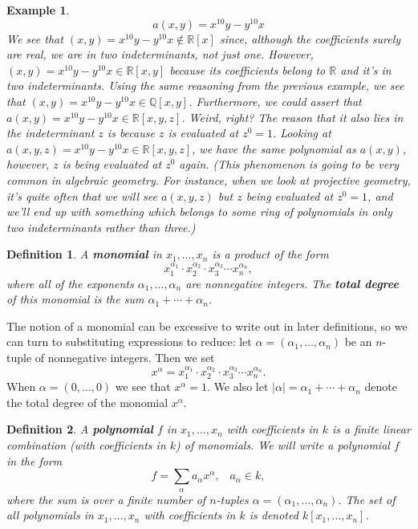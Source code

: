 \documentclass[12pt,reqno]{amsart}
\theoremstyle{plain}
\newtheorem{defi}{Definition}
\newtheorem{ex}{Example}
\newcommand{\rr}{\mathbb R}
\newcommand{\qq}{\mathbb Q}
\newcommand{\gap}{\; \; \;}
\begin{document}
\begin{ex} $$a(x, y) = x^{10} y - y^{10} x $$
We see that $(x, y) = x^{10} y - y^{10} x \notin \rr[x]$ since, although the coefficients surely are real, we are in two indeterminants, not just one. However, $(x, y) = x^{10} y - y^{10} x \in \rr[x, y]$ because its coefficients belong to $\rr$ and it's in two indeterminants. Using the same reasoning from the previous example, we see that $(x, y) = x^{10} y - y^{10} x \in \qq[x,y]$. Furthermore, we could assert that $a(x, y) = x^{10}y-y^{10} x \in \rr[x, y, z ]$. Weird, right? The reason that it also lies in the indeterminant $z$ is because $z$ is evaluated at $z^0=1$. Looking at $a(x, y, z) = x^{10}y-y^{10} x \in \rr[x, y, z ]$, we have the same polynomial as $a(x, y)$, however, $z$ is being evaluated at $z^0$ again. (This phenomenon is going to be very common in algebraic geometry. For instance, when we look at projective geometry, it's quite often that we will see $a(x, y, z)$ but $z$ being evaluated at $z^0=1$, and we'll end up with something which belongs to some ring of polynomials in only two indeterminants rather than three.)
\end{ex}


\begin{defi} A \textup{\textbf{monomial}} in $x_1, \ldots, x_n$ is a product of the form \[ x_1^{\alpha_1} \cdot x_2^{\alpha_2} \cdot x_3^{\alpha_3} \cdots x_n^{\alpha_n},  \] where all of the exponents $\alpha_1, \ldots, \alpha_n$ are nonnegative integers. The \textup{\textbf{total degree}} of this monomial is the sum $\alpha_1 + \cdots + \alpha_n$. 
\end{defi}

The notion of a monomial can be excessive to write out in later definitions, so we can turn to substituting expressions to reduce: let $\alpha = (\alpha_1, \ldots, \alpha_n )$ be an $n$-tuple of nonnegative integers. Then we set $$x^{\alpha} = x_1^{\alpha_1} \cdot x_2^{\alpha_2} \cdot x_3^{\alpha_3} \cdots x_n^{\alpha_n}.$$
When $\alpha = (0, \ldots, 0)$ we see that $x^{\alpha} = 1$. We also let $|\alpha| = \alpha_1 + \cdots + \alpha_n$ denote the total degree of the monomial $x^{\alpha}$.

\begin{defi} A \textup{\textbf{polynomial}} $f$ in $x_1, \ldots, x_n$ with coefficients in $k$ is a finite linear combination (with coefficients in $k$) of monomials. We will write a polynomial $f$ in the form $$f = \sum_{\alpha} a_{\alpha} x^{\alpha}, \gap a_{\alpha} \in k, $$ where the sum is over a finite number of $n$-tuples $\alpha = (\alpha_1, \ldots, \alpha_n )$. The set of all polynomials in $x_1, \ldots , x_n$ with coefficients in $k$ is denoted $k \left[x_1, \ldots , x_n\right]$.
\end{defi}
\end{document}
